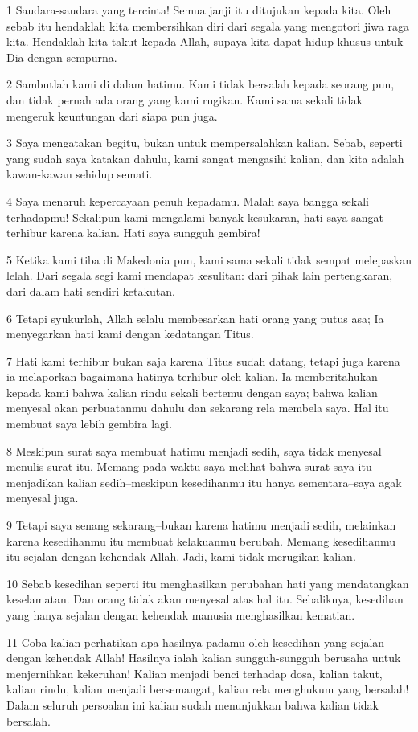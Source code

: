 \par 1 Saudara-saudara yang tercinta! Semua janji itu ditujukan kepada kita. Oleh sebab itu hendaklah kita membersihkan diri dari segala yang mengotori jiwa raga kita. Hendaklah kita takut kepada Allah, supaya kita dapat hidup khusus untuk Dia dengan sempurna.
\par 2 Sambutlah kami di dalam hatimu. Kami tidak bersalah kepada seorang pun, dan tidak pernah ada orang yang kami rugikan. Kami sama sekali tidak mengeruk keuntungan dari siapa pun juga.
\par 3 Saya mengatakan begitu, bukan untuk mempersalahkan kalian. Sebab, seperti yang sudah saya katakan dahulu, kami sangat mengasihi kalian, dan kita adalah kawan-kawan sehidup semati.
\par 4 Saya menaruh kepercayaan penuh kepadamu. Malah saya bangga sekali terhadapmu! Sekalipun kami mengalami banyak kesukaran, hati saya sangat terhibur karena kalian. Hati saya sungguh gembira!
\par 5 Ketika kami tiba di Makedonia pun, kami sama sekali tidak sempat melepaskan lelah. Dari segala segi kami mendapat kesulitan: dari pihak lain pertengkaran, dari dalam hati sendiri ketakutan.
\par 6 Tetapi syukurlah, Allah selalu membesarkan hati orang yang putus asa; Ia menyegarkan hati kami dengan kedatangan Titus.
\par 7 Hati kami terhibur bukan saja karena Titus sudah datang, tetapi juga karena ia melaporkan bagaimana hatinya terhibur oleh kalian. Ia memberitahukan kepada kami bahwa kalian rindu sekali bertemu dengan saya; bahwa kalian menyesal akan perbuatanmu dahulu dan sekarang rela membela saya. Hal itu membuat saya lebih gembira lagi.
\par 8 Meskipun surat saya membuat hatimu menjadi sedih, saya tidak menyesal menulis surat itu. Memang pada waktu saya melihat bahwa surat saya itu menjadikan kalian sedih--meskipun kesedihanmu itu hanya sementara--saya agak menyesal juga.
\par 9 Tetapi saya senang sekarang--bukan karena hatimu menjadi sedih, melainkan karena kesedihanmu itu membuat kelakuanmu berubah. Memang kesedihanmu itu sejalan dengan kehendak Allah. Jadi, kami tidak merugikan kalian.
\par 10 Sebab kesedihan seperti itu menghasilkan perubahan hati yang mendatangkan keselamatan. Dan orang tidak akan menyesal atas hal itu. Sebaliknya, kesedihan yang hanya sejalan dengan kehendak manusia menghasilkan kematian.
\par 11 Coba kalian perhatikan apa hasilnya padamu oleh kesedihan yang sejalan dengan kehendak Allah! Hasilnya ialah kalian sungguh-sungguh berusaha untuk menjernihkan kekeruhan! Kalian menjadi benci terhadap dosa, kalian takut, kalian rindu, kalian menjadi bersemangat, kalian rela menghukum yang bersalah! Dalam seluruh persoalan ini kalian sudah menunjukkan bahwa kalian tidak bersalah.
